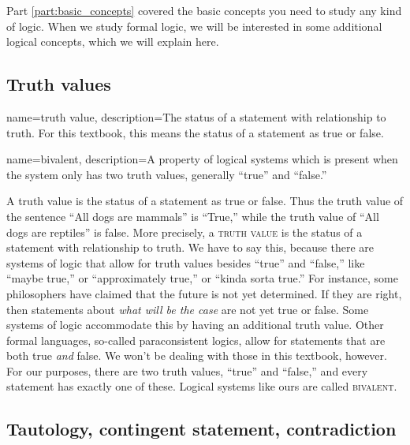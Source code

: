 Part \ref{part:basic_concepts} covered the basic concepts you need to study any kind of logic. When we study formal logic, we will be interested in some additional logical concepts, which we will explain here.


\subsection{Truth values}

{
  name=truth value,
  description={The status of a statement with relationship to truth. For this textbook, this means the status of a statement as true or false.}
}

{
  name=bivalent,
  description={A property of logical systems which is present when the system only has two truth values, generally ``true'' and ``false.''}
}



A truth value is the status of a statement as true or false. Thus the truth value of the sentence ``All dogs are mammals'' is ``True,'' while the truth value of ``All dogs are reptiles'' is false. More precisely, a \textsc{\gls{truth value}} \label{def:Truth_value} is the status of a statement with relationship to truth. We have to say this, because there are systems of logic that allow for truth values besides ``true'' and ``false,'' like ``maybe true,'' or ``approximately true,'' or ``kinda sorta true.'' For instance, some philosophers have claimed that the future is not yet determined. If they are right, then statements about \emph{what will be the case} are not yet true or false. Some systems of logic accommodate this by having an additional truth value. Other formal languages, so-called paraconsistent logics, allow for statements that are both true \emph{and} false. We won't be dealing with those in this textbook, however. For our purposes, there are two truth values, ``true'' and ``false,'' and every statement has exactly one of these. Logical systems like ours are called \textsc{\gls{bivalent}}. \label{def:Bivalent}








\subsection{Tautology, contingent statement, contradiction}


